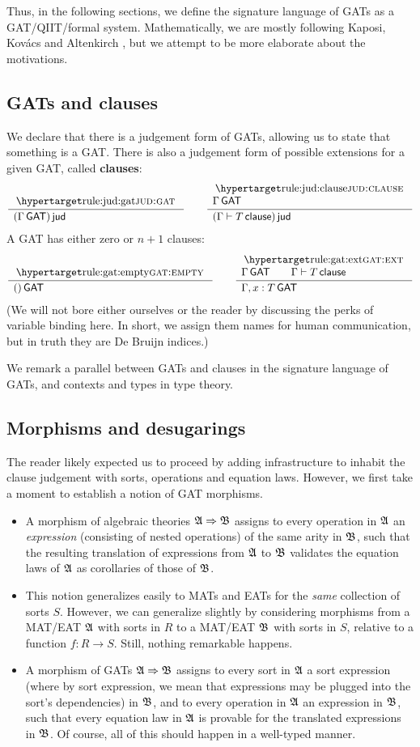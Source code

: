 \documentclass[a4paper]{article}
\begin{document}
Thus, in the following sections, we define the signature language of GATs as a GAT/QIIT/formal system.
Mathematically, we are mostly following Kaposi, Kov\'acs and Altenkirch \cite{constructing-qiits}, but we attempt to be more elaborate about the motivations.

\subsection{GATs and clauses}
We declare that there is a judgement form of GATs, allowing us to state that something is a GAT.
There is also a judgement form of possible extensions for a given GAT, called \textbf{clauses}:
\[
	\inferencel{jud:gat}{
	}{
		(\Gamma \GAT) \jud
	}{}
	\qquad
	\inferencel{jud:clause}{
		\Gamma \GAT
	}{
		(\Gamma \sez T \clause) \jud
	}{}
\]
A GAT has either zero or $n+1$ clauses:
\[
	\inferencel{gat:empty}{
	}{
		() \GAT
	}{}
	\qquad
	\inferencel{gat:ext}{
		\Gamma \GAT \qquad
		\Gamma \sez T \clause
	}{
		\Gamma, x : T \GAT
	}{}
\]
(We will not bore either ourselves or the reader by discussing the perks of variable binding here. In short, we assign them names for human communication, but in truth they are De Bruijn indices.)

We remark a parallel between GATs and clauses in the signature language of GATs, and contexts and types in type theory.

\subsection{Morphisms and desugarings}
The reader likely expected us to proceed by adding infrastructure to inhabit the clause judgement with sorts, operations and equation laws.
However, we first take a moment to establish a notion of GAT morphisms.
\begin{itemize}
	\item A morphism of algebraic theories ${{\mathfrak{A}}} \Rightarrow {{\mathfrak{B}}}$ assigns to every operation in ${{\mathfrak{A}}}$ an \emph{expression} (consisting of nested operations) of the same arity in ${{\mathfrak{B}}}$, such that the resulting translation of expressions from ${{\mathfrak{A}}}$ to ${{\mathfrak{B}}}$ validates the equation laws of ${{\mathfrak{A}}}$ as corollaries of those of ${{\mathfrak{B}}}$.
	\item This notion generalizes easily to MATs and EATs for the \emph{same} collection of sorts $S$. However, we can generalize slightly by considering morphisms from a MAT/EAT ${{\mathfrak{A}}}$ with sorts in $R$ to a MAT/EAT ${{\mathfrak{B}}}$ with sorts in $S$, relative to a function $f : R \to S$.
	Still, nothing remarkable happens.
	\item A morphism of GATs ${{\mathfrak{A}}} \Rightarrow {{\mathfrak{B}}}$ assigns
	to every sort in ${{\mathfrak{A}}}$ a sort expression (where by sort expression, we mean that expressions may be plugged into the sort's dependencies) in ${{\mathfrak{B}}}$, and
	to every operation in ${{\mathfrak{A}}}$ an expression in ${{\mathfrak{B}}}$,
	such that every equation law in ${{\mathfrak{A}}}$ is provable for the translated expressions in ${{\mathfrak{B}}}$.
	Of course, all of this should happen in a well-typed manner.
\end{itemize}
\end{document}
